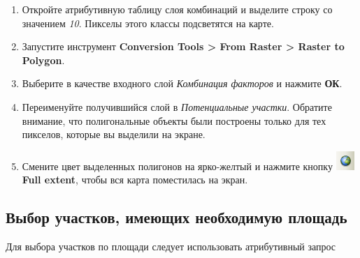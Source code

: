 \documentclass[12pt,]{book}
\begin{document}
\begin{enumerate}
\def\labelenumi{\arabic{enumi}.}
\item
  Откройте атрибутивную таблицу слоя комбинаций и выделите строку со значением \emph{10}. Пикселы этого классы подсветятся на карте.
\item
  Запустите инструмент \textbf{Conversion Tools \textgreater{} From Raster \textgreater{} Raster to Polygon}.
\item
  Выберите в качестве входного слой \emph{Комбинация факторов} и нажмите \textbf{ОК}.
\item
  Переименуйте получившийся слой в \emph{Потенциальные участки}. Обратите внимание, что полигональные объекты были построены только для тех пикселов, которые вы выделили на экране.
\item
  Смените цвет выделенных полигонов на ярко-желтый и нажмите кнопку \includegraphics{images/Ex14/image5.png} \textbf{Full extent}, чтобы вся карта поместилась на экран.
\end{enumerate}

\hypertarget{weighted-overlay-area}{%
\subsection{Выбор участков, имеющих необходимую площадь}\label{weighted-overlay-area}}

Для выбора участков по площади следует использовать атрибутивный запрос
\end{document}
